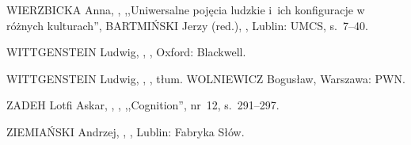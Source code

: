 \documentclass[11pt,a4paper,twoside]{report}
\begin{document}
\begin{thebibliography}{}
{WIERZBICKA Anna},
,
\newblock ,,Uniwersalne pojęcia ludzkie i~ich konfiguracje w różnych kulturach'',
\newblock {[w:]} {BARTMIŃSKI Jerzy (red.)},
,
\newblock Lublin: UMCS, \linebreak
\newblock s.~7--40.

{WITTGENSTEIN Ludwig},
,
,
\newblock Oxford: Blackwell.

{WITTGENSTEIN Ludwig},
,
,
\newblock tłum. {WOLNIEWICZ Bogusław},
\newblock Warszawa: PWN.

{ZADEH Lotfi Askar},
,
,
\newblock {[w:]} ,,Cognition'',
\newblock nr~12, s.~291--297.

{ZIEMIAŃSKI Andrzej},
,
,
\newblock Lublin: Fabryka Słów.

\end{thebibliography}



{
\setlength{\voffset}{0cm}
\setlength{\hoffset}{0cm}


}
\end{document}
